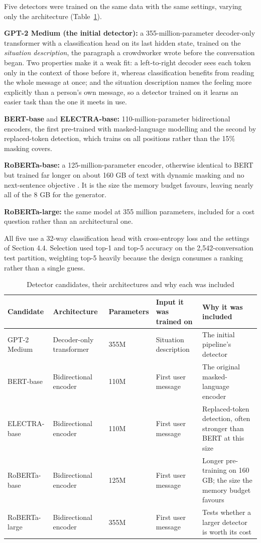 Five detectors were trained on the same data with the same settings, varying only the architecture (Table~\ref{tab:4.2}).

\textbf{GPT-2 Medium (the initial detector):} a 355-million-parameter decoder-only transformer with a classification head on its last hidden state, trained on the \textit{situation description}, the paragraph a crowdworker wrote before the conversation began. Two properties make it a weak fit: a left-to-right decoder sees each token only in the context of those before it, whereas classification benefits from reading the whole message at once; and the situation description names the feeling more explicitly than a person's own message, so a detector trained on it learns an easier task than the one it meets in use.

\textbf{BERT-base }and \textbf{ELECTRA-base: }110-million-parameter bidirectional encoders, the first pre-trained with masked-language modelling \cite{devlin2019} and the second by replaced-token detection, which trains on all positions rather than the 15\% masking covers.

\textbf{RoBERTa-base:} a 125-million-parameter encoder, otherwise identical to BERT but trained far longer on about 160 GB of text with dynamic masking and no next-sentence objective \cite{liu2019roberta}. It is the size the memory budget favours, leaving nearly all of the 8 GB for the generator.

\textbf{RoBERTa-large: }the same model at 355 million parameters, included for a cost question rather than an architectural one.

All five use a 32-way classification head with cross-entropy loss and the settings of Section 4.4. Selection used top-1 and top-5 accuracy on the 2,542-conversation test partition, weighting top-5 heavily because the design consumes a ranking rather than a single guess.

\begin{table}[H]
\centering
\scriptsize
\begin{tabularx}{\textwidth}{@{}lXXXX@{}}
\toprule
\textbf{Candidate} & \textbf{Architecture} & \textbf{Parameters} & \textbf{Input it was trained on} & \textbf{Why it was included} \\
\midrule
GPT-2 Medium & Decoder-only transformer & 355M & Situation description & The initial pipeline's detector \\
BERT-base & Bidirectional encoder & 110M & First user message & The original masked-language encoder \\
ELECTRA-base & Bidirectional encoder & 110M & First user message & Replaced-token detection, often stronger than BERT at this size \\
RoBERTa-base & Bidirectional encoder & 125M & First user message & Longer pre-training on 160 GB; the size the memory budget favours \\
RoBERTa-large & Bidirectional encoder & 355M & First user message & Tests whether a larger detector is worth its cost \\
\bottomrule
\end{tabularx}
\caption{Detector candidates, their architectures and why each was included}
\label{tab:4.2}
\end{table}

